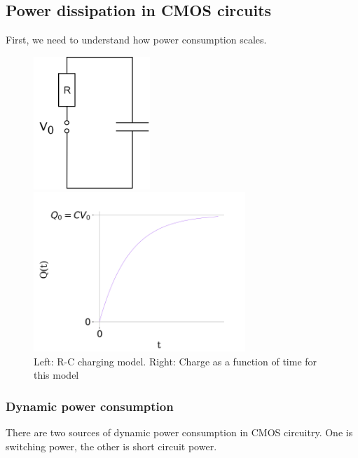 \documentclass[12pt,a4paper]{article}
\begin{document}
\subsection{Power dissipation in CMOS circuits}
First, we need to understand how power consumption scales.
\begin{figure} [h]
	\centering	
    \begin{minipage}{.5\textwidth}
		\centering
		\includegraphics[height = 5cm]{Source/CapacitorCharging.png}
	\end{minipage}%
	\begin{minipage}{0.5\textwidth}
		\centering
		\includegraphics[height = 6cm]{Source/charge.png}
	\end{minipage}
	\caption{Left: R-C charging model. Right: Charge as a function of time for this model }
	\label{capacitorCharging}
\end{figure}

\subsubsection{Dynamic power consumption}
There are two sources of dynamic power consumption in CMOS circuitry. One is switching power, the other is short circuit power.\\
\end{document}
